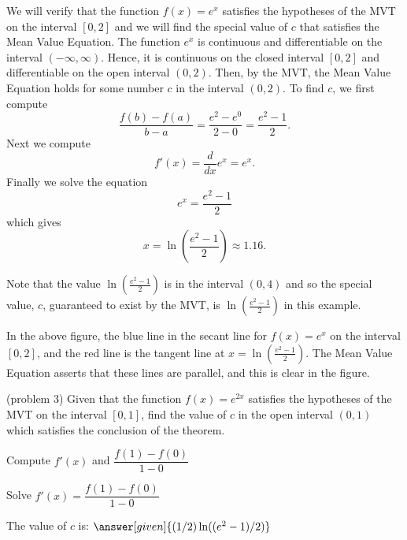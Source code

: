 \documentclass{ximera}
\begin{document}
\begin{example}[example 3]
We will verify that the function $f(x) = e^x$ satisfies the hypotheses of the MVT
on the interval $[0,2]$ and we will find the special value of $c$ that satisfies the Mean Value Equation.
The function $e^x$ is continuous and differentiable on the interval $(-\infty, \infty)$. 
Hence, it is continuous on the closed interval $[0, 2]$ and differentiable on the open interval $(0, 2)$. 
Then, by the MVT,  the Mean Value Equation holds for some number 
$c$ in the interval $(0, 2)$. To find $c$, we first compute
\[\frac{f(b) - f(a)}{b-a} = \frac{e^2 - e^0}{2-0} = \frac{e^2 - 1}{2}.\]
Next we compute
\[f'(x) = \frac{d}{dx} e^x = e^x.\]
Finally we solve the equation
\[e^x = \frac{e^2 - 1}{2}\]
which gives
\[ x = \ln(\frac{e^2 - 1}{2}) \approx 1.16.\]

Note that the value $\ln(\frac{e^2 - 1}{2})$ is in the interval $(0,4)$ and so the special value, $c$, 
guaranteed to exist by the MVT,
is $\ln(\frac{e^2 - 1}{2})$ in this example.


\begin{image}
\end{image}

In the above figure, the blue line in the secant line for $f(x) = e^x$ on the interval $[0, 2]$, 
and the red line is the tangent line at $x = \ln(\frac{e^2 - 1}{2})$. 
The Mean Value Equation asserts that these lines are parallel, and this
is clear in the figure.
\end{example}


\begin{problem}(problem 3)
  Given that the function $f(x) = e^{2x}$ satisfies the hypotheses of the MVT on the
	interval $[0,1]$, find the value of $c$ in the open interval $(0,1)$ which satisfies 
	the conclusion of the theorem.
	
    \begin{hint}
      Compute $f'(x)$ and $\dfrac{f(1) - f(0)}{1-0}$
    \end{hint}
		\begin{hint}
		  Solve $f'(x) = \dfrac{f(1) - f(0)}{1-0}$
		\end{hint}
		
		The value of $c$ is:
		 $\answer[given]{(1/2) \ln((e^2 -1)/2)}$
\end{problem}
\end{document}

